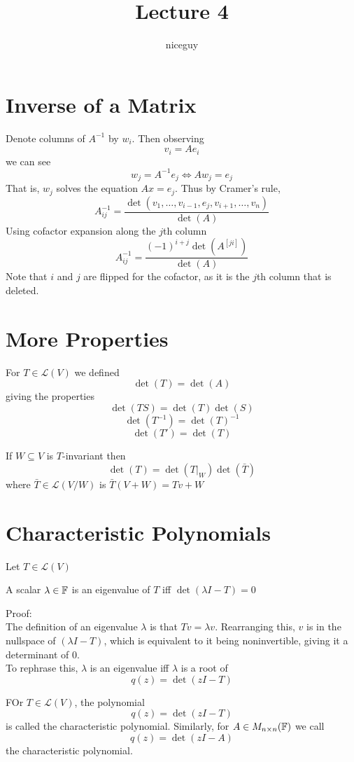 \documentclass[12pt]{article}
\author{niceguy}
\title{Lecture 4}
\begin{document}
\maketitle

\section{Inverse of a Matrix}

Denote columns of $A^{-1}$ by $w_i$. Then observing
$$v_i = Ae_i$$
we can see
$$w_j = A^{-1}e_j \Leftrightarrow Aw_j = e_j$$
That is, $w_j$ solves the equation $Ax=e_j$. Thus by Cramer's rule,
$$A^{-1}_{ij} = \frac{\det(v_1,\dots,v_{i-1},e_j,v_{i+1},\dots,v_n)}{\det(A)}$$
Using cofactor expansion along the $j$th column
$$A^{-1}_{ij} = \frac{(-1)^{i+j}\det(A^{[ji]})}{\det(A)}$$
Note that $i$ and $j$ are flipped for the cofactor, as it is the $j$th column that is deleted.

\section{More Properties}

For $T\in\mathcal{L}(V)$ we defined
$$\det(T) = \det(A)$$
giving the properties
$$\det(TS) = \det(T)\det(S)$$
$$\det(T^{-1}) = \det(T)^{-1}$$
$$\det(T') = \det(T)$$

If $W\subseteq V$ is $T$-invariant then
$$\det(T) = \det(T|_W)\det(\bar{T})$$
where $\bar{T} \in \mathcal{L}(V/W)$ is $\bar{T}(V+W) = Tv+W$

\section{Characteristic Polynomials}

Let $T\in\mathcal{L}(V)$

\begin{thm}
	A scalar $\lambda\in\mathbb{F}$ is an eigenvalue of $T$ iff $\det(\lambda I-T) = 0$
\end{thm}

Proof: \\
The definition of an eigenvalue $\lambda$ is that $Tv=\lambda v$. Rearranging this, $v$ is in the nullspace of $(\lambda I-T)$, which is equivalent to it being noninvertible, giving it a determinant of 0. \\
To rephrase this, $\lambda$ is an eigenvalue iff $\lambda$ is a root of
$$q(z) = \det(zI - T)$$

\begin{defn}
	FOr $T\in\mathcal{L}(V)$, the polynomial
	$$q(z) = \det(zI-T)$$
	is called the characteristic polynomial. Similarly, for $A\in M_{n\times n}(\mathbb{F})$ we call
	$$q(z) = \det(zI-A)$$
	the characteristic polynomial.
\end{defn}
\end{document}
